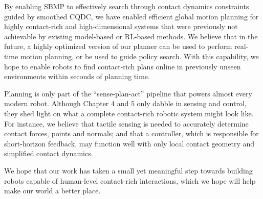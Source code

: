 By enabling SBMP to effectively search through contact dynamics constraints guided by smoothed CQDC, we have enabled efficient global motion planning for highly contact-rich and high-dimensional systems that were previously not achievable by existing model-based or RL-based methods. We believe that in the future, a highly optimized version of our planner can be used to perform real-time motion planning, or be used to guide policy search. With this capability, we hope to enable robots to find contact-rich plans online in previously unseen environments within seconds of planning time.

Planning is only part of the ``sense-plan-act'' pipeline that powers almost every modern robot. Although Chapter 4 and 5 only dabble in sensing and control, they shed light on what a complete contact-rich robotic system might look like. For instance, we believe that tactile sensing is needed to accurately determine contact forces, points and normals; and that a controller, which is responsible for short-horizon feedback, may function well with only local contact geometry and simplified contact dynamics. 


We hope that our work has taken a small yet meaningful step towards building robots capable of human-level contact-rich interactions, which we hope will help make our world a better place. 




